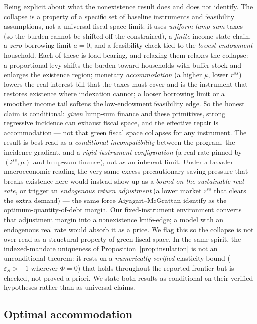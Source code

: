 \documentclass[12pt]{article}
\begin{document}
Being explicit about what the nonexistence result does and does not identify.
The collapse is a property of a specific set of baseline instruments and
feasibility assumptions, not a universal fiscal-space limit: it uses
\emph{uniform lump-sum} taxes (so the burden cannot be shifted off the
constrained), a \emph{finite} income-state chain, a \emph{zero} borrowing limit
$\bar a=0$, and a feasibility check tied to the \emph{lowest-endowment}
household. Each of these is load-bearing, and relaxing them relaxes the
collapse: a proportional levy shifts the burden toward households with buffer
stock and enlarges the existence region; monetary \emph{accommodation} (a
higher $\mu$, lower $r^{ss}$) lowers the real interest bill that the taxes must
cover and is the instrument that restores existence where indexation cannot; a
looser borrowing limit or a smoother income tail softens the low-endowment
feasibility edge. So the honest claim is conditional: \emph{given}
lump-sum finance and these primitives, strong regressive incidence can exhaust
fiscal space, and the effective repair is accommodation --- not that green
fiscal space collapses for any instrument. The result is best read as a
\emph{conditional incompatibility} between the program, the incidence gradient,
and a \emph{rigid instrument configuration} (a real rate pinned by
$(i^{ss},\mu)$ and lump-sum finance), not as an inherent limit. Under a broader
macroeconomic reading the very same excess-precautionary-saving pressure that
breaks existence here would instead show up as a \emph{bound on the sustainable
real rate}, or trigger an \emph{endogenous return adjustment} (a lower market
$r^{ss}$ that clears the extra demand) --- the same force Aiyagari--McGrattan
identify as the optimum-quantity-of-debt margin. Our fixed-instrument
environment converts that adjustment margin into a nonexistence knife-edge; a
model with an endogenous real rate would absorb it as a price. We flag this so
the collapse is not over-read as a structural property of green fiscal space. In the same spirit, the
indexed-mandate uniqueness of Proposition~\ref{prop:insulation} is not an
unconditional theorem: it rests on a \emph{numerically verified} elasticity
bound ($\varepsilon_S>-1$ wherever $\Phi=0$) that holds throughout the reported
frontier but is checked, not proved a priori. We state both results as
conditional on their verified hypotheses rather than as universal claims.

\subsection{Optimal accommodation}
\end{document}
